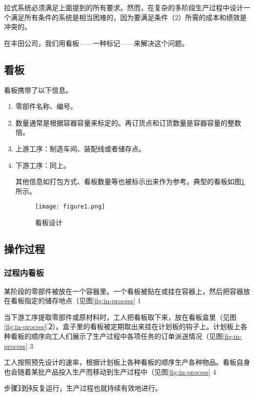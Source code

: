 拉式系统必须满足上面提到的所有要求。然而，在复杂的多阶段生产过程中设计一个满足所有条件的系统是相当困难的，因为要满足条件（2）所需的成本和绩效是冲突的。

在丰田公司，我们用看板——一种标记——来解决这个问题。

\subsection{看板}

看板携带了以下信息。

\begin{enumerate}
\item
零部件名称、编号。
\item
数量通常是根据容器容量来标定的。再订货点和订货数量是容器容量的整数倍。
\item
上游工序：制造车间、装配线或者储存点。
\item
下游工序：同上。

其他信息如打包方式、看板数量等也被标示出来作为参考。典型的看板如图\ref{fig:layout}所示。

\begin{figure}[htbp]
\centering
\texttt{[image: figure1.png]}
\caption{看板设计}
\label{fig:layout}
\end{figure}
\end{enumerate}

\subsection{操作过程}

\subsubsection{过程内看板}

某阶段的零部件被放在一个容器里。一个看板被贴在或挂在容器上，然后把容器放在看板指定的储存地点（见图\ref{fig:in-process} \textcircled{1}）。

当下游工序提取零部件或原材料时，工人把看板取下来，放在看板盒里（见图\ref{fig:in-process} \textcircled{2}）。盒子里的看板被定期取出来挂在计划板的钩子上。计划板上各种看板的顺序向工人们展示了生产过程中各项任务的订单派送情况（见图\ref{fig:in-process} \textcircled{3}）。

工人按照预先设计的速率，根据计划板上各种看板的顺序生产各种物品。看板自身也会随着某批产品投入生产而移动到生产过程中（见图\ref{fig:in-process} \textcircled{4}）。

步骤\textcircled{1}到\textcircled{4}反复运行，生产过程也就持续有效地进行。

